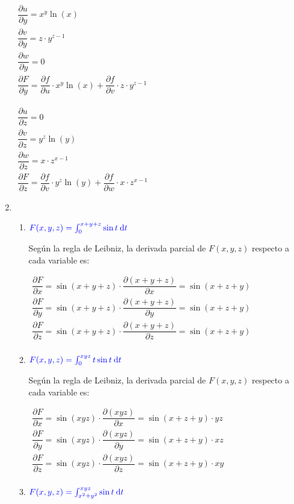 \begin{enumerate}[label=\color{red}\textbf{\arabic*)}, leftmargin=*]
$\begin{array}{l}
\dfrac{\partial u}{\partial y}=x^{y}\ln(x)\\
\dfrac{\partial v}{\partial y}=z\cdot y^{z-1}\\
\dfrac{\partial w}{\partial y}=0\\
\dfrac{\partial F}{\partial y}=\dfrac{\partial f}{\partial u}\cdot x^{y}\ln(x)+\dfrac{\partial f}{\partial v}\cdot z\cdot y^{z-1}
\end{array}$

$\begin{array}{l}
\dfrac{\partial u}{\partial z}=0\\
\dfrac{\partial v}{\partial z}=y^{z}\ln(y)\\
\dfrac{\partial w}{\partial z}=x\cdot z^{x-1}\\
\dfrac{\partial F}{\partial z}=\dfrac{\partial f}{\partial v}\cdot y^{z}\ln(y)+\dfrac{\partial f}{\partial w}\cdot x\cdot z^{x-1}
\end{array}$

\item {}
\begin{enumerate}[label=\color{red}\textbf{\alph*)}]
	\item $\textcolor{blue}{F(x,y,z)=\int_{0}^{x+y+z}\sin t\:\mathrm{d}t}$
	
	Según la regla de Leibniz, la derivada parcial de $F(x,y,z)$ respecto a cada variable es:
	
	$\begin{array}{l}
	\dfrac{\partial F}{\partial x}=\sin(x+y+z)\cdot\dfrac{\partial (x+y+z)}{\partial x}=\sin(x+z+y)\\
	\dfrac{\partial F}{\partial y}=\sin(x+y+z)\cdot\dfrac{\partial (x+y+z)}{\partial y}=\sin(x+z+y)\\
	\dfrac{\partial F}{\partial z}=\sin(x+y+z)\cdot\dfrac{\partial (x+y+z)}{\partial z}=\sin(x+z+y)\\
	\end{array}$
	\item $\textcolor{blue}{F(x,y,z)=\int_{0}^{xyz}t\sin t\:\mathrm{d}t}$
	
	Según la regla de Leibniz, la derivada parcial de $F(x,y,z)$ respecto a cada variable es:
		
		$\begin{array}{l}
		\dfrac{\partial F}{\partial x}=\sin(xyz)\cdot\dfrac{\partial (xyz)}{\partial x}=\sin(x+z+y)\cdot yz\\
		\dfrac{\partial F}{\partial y}=\sin(xyz)\cdot\dfrac{\partial (xyz)}{\partial y}=\sin(x+z+y)\cdot xz\\
		\dfrac{\partial F}{\partial z}=\sin(xyz)\cdot\dfrac{\partial (xyz)}{\partial z}=\sin(x+z+y)\cdot xy\\
		\end{array}$
	\item $\textcolor{blue}{F(x,y,z)=\int_{x^2+y^2}^{xyz}\sin t\:\mathrm{d}t}$
	

\end{enumerate}
\end{enumerate}
